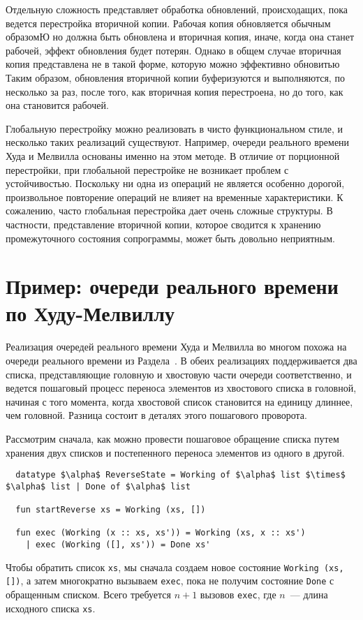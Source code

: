 Отдельную сложность представляет обработка обновлений, происходащих,
пока ведется перестройка вторичной копии. Рабочая копия обновляется
обычным образомЮ но должна быть обновлена и вторичная копия, иначе,
когда она станет рабочей, эффект обновления будет потерян. Однако в
общем случае вторичная копия представлена не в такой форме, которую
можно эффективно обновитью Таким образом, обновления вторичной копии
буферизуются и выполняются, по несколько за раз, после того, как
вторичная копия перестроена, но до того, как она становится рабочей.

Глобальную перестройку можно реализовать в чисто функциональном стиле,
и несколько таких реализаций существуют. Например, очереди реального
времени Худа и Мелвилла \cite{HoodMelville1981} основаны именно на
этом методе. В отличие от порционной перестройки, при глобальной
перестройке не возникает проблем с устойчивостью. Поскольку ни одна из
операций не является особенно дорогой, произвольное повторение
операций не влияет на временные характеристики.  К сожалению, часто
глобальная перестройка дает очень сложные структуры. В частности,
представление вторичной копии, которое сводится к хранению
промежуточного состояния сопрограммы, может быть довольно неприятным.

\section{Пример: очереди реального времени по Худу-Мелвиллу}
\label{sc:8.2.1}

Реализация очередей реального времени Худа и Мелвилла
\cite{HoodMelville1981} во многом похожа на очереди реального времени
из Раздела~\cite{sc:7.2}. В обеих реализациях поддерживается два
списка, представляющие головную и хвостовую части очереди
соответственно, и ведется пошаговый процесс переноса элементов из
хвостового списка в головной, начиная с того момента, когда хвостовой
список становится на единицу длиннее, чем головной.  Разница состоит в
деталях этого пошагового проворота.

Рассмотрим сначала, как можно провести пошаговое обращение списка
путем хранения двух списков и постепенного переноса элементов из
одного в другой.
\begin{lstlisting}
  datatype $\alpha$ ReverseState = Working of $\alpha$ list $\times$ $\alpha$ list | Done of $\alpha$ list
  
  fun startReverse xs = Working (xs, [])

  fun exec (Working (x :: xs, xs')) = Working (xs, x :: xs')
    | exec (Working ([], xs')) = Done xs'
\end{lstlisting}
Чтобы обратить список \lstinline!xs!, мы сначала создаем новое
состояние \lstinline!Working (xs, [])!, а затем многократно вызываем
\lstinline!exec!, пока не получим состояние \lstinline!Done! с
обращенным списком. Всего требуется $n + 1$ вызовов \lstinline!exec!,
где $n$~--- длина исходного списка \lstinline!xs!.


